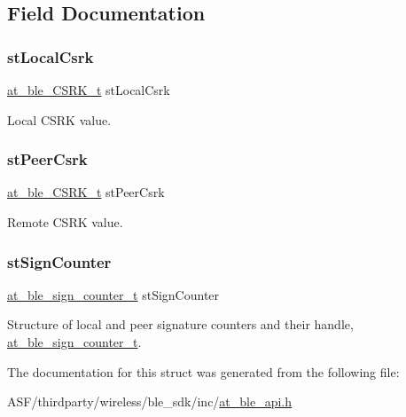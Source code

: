 \subsection{Field Documentation}
\mbox{\label{structat__ble__signature__info__t_ad251af7cd858494e349a74151cdf021b}} 
\subsubsection{\texorpdfstring{stLocalCsrk}{stLocalCsrk}}
{\footnotesize\ttfamily \mbox{\hyperlink{structat__ble___c_s_r_k__t}{at\+\_\+ble\+\_\+\+C\+S\+R\+K\+\_\+t}} st\+Local\+Csrk}



Local C\+S\+RK value. 

\mbox{\label{structat__ble__signature__info__t_a5e7f9cfbc5e9b0f34fbd4b7572fcebf3}} 
\subsubsection{\texorpdfstring{stPeerCsrk}{stPeerCsrk}}
{\footnotesize\ttfamily \mbox{\hyperlink{structat__ble___c_s_r_k__t}{at\+\_\+ble\+\_\+\+C\+S\+R\+K\+\_\+t}} st\+Peer\+Csrk}



Remote C\+S\+RK value. 

\mbox{\label{structat__ble__signature__info__t_af42a5218c3cc8cba767a5ef11c40b8aa}} 
\subsubsection{\texorpdfstring{stSignCounter}{stSignCounter}}
{\footnotesize\ttfamily \mbox{\hyperlink{structat__ble__sign__counter__t}{at\+\_\+ble\+\_\+sign\+\_\+counter\+\_\+t}} st\+Sign\+Counter}



Structure of local and peer signature counters and their handle, \mbox{\hyperlink{structat__ble__sign__counter__t}{at\+\_\+ble\+\_\+sign\+\_\+counter\+\_\+t}}. 



The documentation for this struct was generated from the following file\+:\begin{DoxyCompactItemize}
\item 
A\+S\+F/thirdparty/wireless/ble\+\_\+sdk/inc/\mbox{\hyperlink{at__ble__api_8h}{at\+\_\+ble\+\_\+api.\+h}}\end{DoxyCompactItemize}
